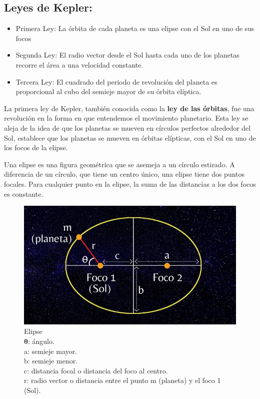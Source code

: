 \documentclass{article}
\begin{document}
	\subsection{Leyes de Kepler:}
	
	\begin{itemize}
		\item Primera Ley: La órbita de cada planeta es una elipse con el Sol en uno de sus focos
		\item Segunda Ley: El radio vector desde el Sol hasta cada uno de los planetas recorre el área a una velocidad constante.
		\item Tercera Ley: El cuadrado del periodo de revolución del planeta es proporcional al cubo del semieje mayor de su órbita elíptica.
	\end{itemize}
	
	La primera ley de Kepler, también conocida como la \textbf{ley de las órbitas}, fue una revolución en la forma en que entendemos el movimiento planetario. Esta ley se aleja de la idea de que los planetas se mueven en círculos perfectos alrededor del Sol,  establece que los planetas se mueven en órbitas elípticas, con el Sol en uno de los focos de la elipse.
	
	Una elipse es una figura geométrica que se asemeja a un círculo estirado. A diferencia de un círculo, que tiene un centro único, una elipse tiene dos puntos focales. Para cualquier punto en la elipse, la suma de las distancias a los dos focos es constante.
	
	\begin{figure}
		\centering
		\includegraphics[width=0.6\linewidth]{elipse}
		\caption{Elipse \\ 
			     $\mathbf{\theta}$: ángulo.\\
			     a: semieje mayor.\\
		         b: semieje menor.\\
		         c: distancia focal o distancia del foco al centro.\\
		         r: radio vector o distancia entre el punto m (planeta) y el foco 1 (Sol).}
		\label{fig:elipse}
	\end{figure}
	
\end{document}
